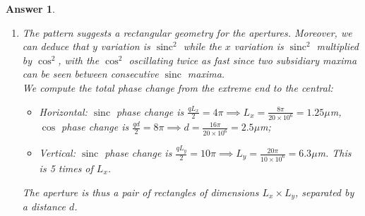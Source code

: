 \documentclass[a4paper]{article}
\DeclareMathOperator{\sinc}{sinc}
\newtheorem{ans}{Answer}[subsection]
\theoremstyle{new}
\begin{document}
\begin{ans}
\begin{enumerate}[label=(\alph*)]
\begin{figure}[H]
    \caption{Observed intensity pattern on the screen, along a distance perpendicular to the screen-distance axis.}
\end{figure}
\item The pattern suggests a rectangular geometry for the apertures. Moreover, we can deduce that $y$ variation is $\sinc^2$ while the $x$ variation is $\sinc^2$ multiplied by $\cos^2$, with the $\cos^2$ oscillating twice as fast since two subsidiary maxima can be seen between consecutive $\sinc$ maxima.\\[5pt]
We compute the total phase change from the extreme end to the central:
\begin{itemize}
    \item Horizontal: $\sinc$ phase change is $\frac{qL_x}{2}=4\pi\implies L_x=\frac{8\pi}{20\times10^{6}}=1.25\mu$m, $\cos$ phase change is $\frac{qd}{2}=8\pi\implies d=\frac{16\pi}{20\times10^6}=2.5\mu$m;
    \item Vertical: $\sinc$ phase change is $\frac{qL_y}{2}=10\pi\implies L_y=\frac{20\pi}{10\times10^6}=6.3\mu$m. This is 5 times of $L_x$.
\end{itemize}
The aperture is thus a pair of rectangles of dimensions $L_x\times L_y$, separated by a distance $d$. 
\end{enumerate}
\end{ans}
\end{document}
